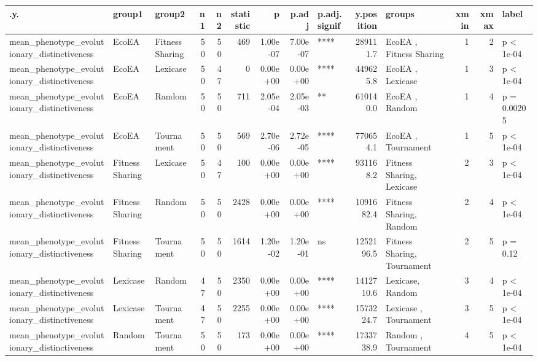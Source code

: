 \documentclass[]{book}
\begin{document}
\begin{table}
\centering
\begin{tabular}[t]{l|l|l|r|r|r|r|r|l|r|l|r|r|l}
\hline
.y. & group1 & group2 & n1 & n2 & statistic & p & p.adj & p.adj.signif & y.position & groups & xmin & xmax & label\\
\hline
mean\_phenotype\_evolutionary\_distinctiveness & EcoEA & Fitness Sharing & 50 & 50 & 469 & 1.00e-07 & 7.00e-07 & **** & 289111.7 & EcoEA          , Fitness Sharing & 1 & 2 & p < 1e-04\\
\hline
mean\_phenotype\_evolutionary\_distinctiveness & EcoEA & Lexicase & 50 & 47 & 0 & 0.00e+00 & 0.00e+00 & **** & 449625.8 & EcoEA   , Lexicase & 1 & 3 & p < 1e-04\\
\hline
mean\_phenotype\_evolutionary\_distinctiveness & EcoEA & Random & 50 & 50 & 711 & 2.05e-04 & 2.05e-03 & ** & 610140.0 & EcoEA , Random & 1 & 4 & p = 0.00205\\
\hline
mean\_phenotype\_evolutionary\_distinctiveness & EcoEA & Tournament & 50 & 50 & 569 & 2.70e-06 & 2.72e-05 & **** & 770654.1 & EcoEA     , Tournament & 1 & 5 & p < 1e-04\\
\hline
mean\_phenotype\_evolutionary\_distinctiveness & Fitness Sharing & Lexicase & 50 & 47 & 100 & 0.00e+00 & 0.00e+00 & **** & 931168.2 & Fitness Sharing, Lexicase & 2 & 3 & p < 1e-04\\
\hline
mean\_phenotype\_evolutionary\_distinctiveness & Fitness Sharing & Random & 50 & 50 & 2428 & 0.00e+00 & 0.00e+00 & **** & 1091682.4 & Fitness Sharing, Random & 2 & 4 & p < 1e-04\\
\hline
mean\_phenotype\_evolutionary\_distinctiveness & Fitness Sharing & Tournament & 50 & 50 & 1614 & 1.20e-02 & 1.20e-01 & ns & 1252196.5 & Fitness Sharing, Tournament & 2 & 5 & p = 0.12\\
\hline
mean\_phenotype\_evolutionary\_distinctiveness & Lexicase & Random & 47 & 50 & 2350 & 0.00e+00 & 0.00e+00 & **** & 1412710.6 & Lexicase, Random & 3 & 4 & p < 1e-04\\
\hline
mean\_phenotype\_evolutionary\_distinctiveness & Lexicase & Tournament & 47 & 50 & 2255 & 0.00e+00 & 0.00e+00 & **** & 1573224.7 & Lexicase  , Tournament & 3 & 5 & p < 1e-04\\
\hline
mean\_phenotype\_evolutionary\_distinctiveness & Random & Tournament & 50 & 50 & 173 & 0.00e+00 & 0.00e+00 & **** & 1733738.9 & Random    , Tournament & 4 & 5 & p < 1e-04\\
\hline
\end{tabular}
\end{table}
\end{document}
